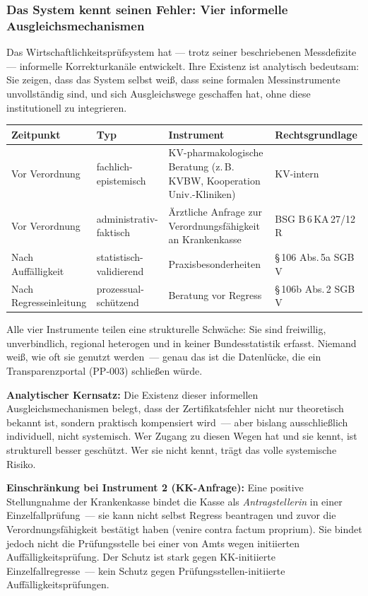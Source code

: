 \documentclass{umbruch-position}
\begin{document}
\subsubsection{Das System kennt seinen Fehler: Vier informelle Ausgleichs\-mechanismen}

Das Wirtschaftlichkeitsprüfsystem hat --- trotz seiner beschriebenen Messdefizite --- informelle Korrekturkanäle entwickelt. Ihre Existenz ist analytisch bedeutsam: Sie zeigen, dass das System selbst weiß, dass seine formalen Messinstrumente unvollständig sind, und sich Ausgleichswege geschaffen hat, ohne diese institutionell zu integrieren.

{\small
\begin{tabularx}{\textwidth}{l l X l}
\toprule
\textbf{Zeitpunkt} & \textbf{Typ} & \textbf{Instrument} & \textbf{Rechtsgrundlage} \\
\midrule
Vor Verordnung & fachlich-epistemisch & KV-pharmakologische Beratung (z.\,B. KVBW, Kooperation Univ.-Kliniken) & KV-intern \\
\addlinespace
Vor Verordnung & administrativ-faktisch & Ärztliche Anfrage zur Verordnungs\-fähigkeit an Krankenkasse & BSG B\,6\,KA\,27/12\,R \\
\addlinespace
Nach Auffälligkeit & statistisch-validierend & Praxisbesonderheiten & \S\,106 Abs.\,5a SGB\,V \\
\addlinespace
Nach Regresseinleitung & prozessual-schützend & Beratung vor Regress & \S\,106b Abs.\,2 SGB\,V \\
\bottomrule
\end{tabularx}
}

Alle vier Instrumente teilen eine strukturelle Schwäche: Sie sind freiwillig, unverbindlich, regional heterogen und in keiner Bundesstatistik erfasst. Niemand weiß, wie oft sie genutzt werden~--- genau das ist die Datenlücke, die ein Transparenzportal (PP-003) schließen würde.

\textbf{Analytischer Kernsatz:} Die Existenz dieser informellen Ausgleichsmechanismen belegt, dass der Zertifikatsfehler nicht nur theoretisch bekannt ist, sondern praktisch kompensiert wird~--- aber bislang ausschließlich individuell, nicht systemisch. Wer Zugang zu diesen Wegen hat und sie kennt, ist strukturell besser geschützt. Wer sie nicht kennt, trägt das volle systemische Risiko.

\textbf{Einschränkung bei Instrument 2 (KK-Anfrage):} Eine positive Stellungnahme der Krankenkasse bindet die Kasse als \textit{Antragstellerin} in einer Einzelfallprüfung~--- sie kann nicht selbst Regress beantragen und zuvor die Verordnungsfähigkeit bestätigt haben (venire contra factum proprium). Sie bindet jedoch nicht die Prüfungsstelle bei einer von Amts wegen initiierten Auffälligkeitsprüfung. Der Schutz ist stark gegen KK-initiierte Einzelfallregresse~--- kein Schutz gegen Prüfungsstellen-initiierte Auffälligkeitsprüfungen.
\end{document}

